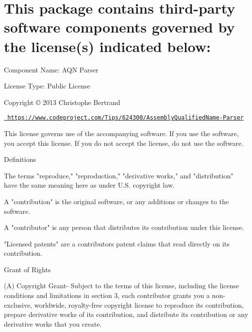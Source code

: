 \chapter{This package contains third-\/party software components governed by the license(s) indicated below\+:}
\hypertarget{md__hey_tea_9_2_library_2_package_cache_2com_8unity_8visualscripting_0d1_88_80_2_third_01_party_01_notices}{}\label{md__hey_tea_9_2_library_2_package_cache_2com_8unity_8visualscripting_0d1_88_80_2_third_01_party_01_notices}
Component Name\+: AQN Parser

License Type\+:  Public License

Copyright © 2013 Christophe Bertrand

\href{https://www.codeproject.com/Tips/624300/AssemblyQualifiedName-Parser}{\texttt{ https\+://www.\+codeproject.\+com/\+Tips/624300/\+Assembly\+Qualified\+Name-\/\+Parser}}

This license governs use of the accompanying software. If you use the software, you accept this license. If you do not accept the license, do not use the software.


\begin{DoxyEnumerate}
\item Definitions
\end{DoxyEnumerate}

The terms "{}reproduce,"{} "{}reproduction,"{} "{}derivative works,"{} and "{}distribution"{} have the same meaning here as under U.\+S. copyright law.

A "{}contribution"{} is the original software, or any additions or changes to the software.

A "{}contributor"{} is any person that distributes its contribution under this license.

"{}\+Licensed patents"{} are a contributor\textquotesingle{}s patent claims that read directly on its contribution.


\begin{DoxyEnumerate}
\item Grant of Rights
\end{DoxyEnumerate}

(A) Copyright Grant-\/ Subject to the terms of this license, including the license conditions and limitations in section 3, each contributor grants you a non-\/exclusive, worldwide, royalty-\/free copyright license to reproduce its contribution, prepare derivative works of its contribution, and distribute its contribution or any derivative works that you create.

